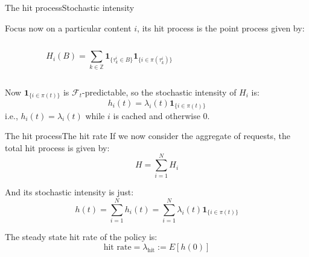\documentclass[aspectratio=169]{beamer}
\newcommand{\ind}[1]{\mathbf{1}_{#1}}
\begin{document}
\begin{frame}{The hit process}{Stochastic intensity}
	
	Focus now on a particular content $i$, its \alert{hit process} is the point process given by:

	\vfill

	\begin{columns}
		\begin{column}{0.5\textwidth}
			\begin{equation*}
				H_i(B) = \sum_{k\in\mathbb{Z}} \ind{\{\tau_k^i\in B\}}\ind{\{i\in \pi(\tau_k^i)\}}
			\end{equation*}
		\end{column}
		\begin{column}{0.5\textwidth}

		\end{column}
	\end{columns}

	\vfill

	Now $\ind{\{i\in \pi(t)\}}$ is $\mathcal{F}_t$-predictable, so the stochastic intensity of $H_i$ is:
	\begin{equation*}
		h_i(t) = \lambda_i(t) \ind{\{i\in \pi(t)\}}
	\end{equation*}
	i.e., $h_i(t)=\lambda_i(t)$ while $i$ is cached and otherwise $0$.
\end{frame}

\begin{frame}{The hit process}{The hit rate}
	If we now consider the aggregate of requests, the \alert{total hit process} is given by:
	\begin{equation*}
		H = \sum_{i=1}^N H_i
	\end{equation*}

	And its stochastic intensity is just:
	\begin{equation*}
		h(t) = \sum_{i=1}^N h_i(t) = \sum_{i=1}^N \lambda_i(t) \ind{\{i\in \pi(t)\}}
	\end{equation*}

	The steady state \alert{hit rate} of the policy is:
	\begin{equation*}
		\text{hit rate} = \lambda_{\text{hit}} := E[h(0)]
	\end{equation*}
	
\end{frame}
\end{document}
